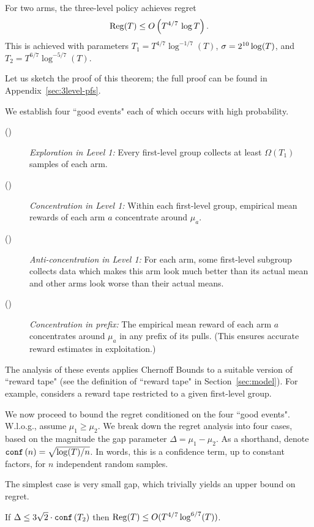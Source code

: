 \begin{theorem}
\label{thm:3level}
For two arms, the three-level policy
achieves regret
\[ \mathrm{Reg}(T) \leq O\left( T^{4/7}\, \log T \right).\]
This is achieved with parameters
    $T_1 = T^{4/7}\log^{-1/7}(T)$,
    $\sigma = 2^{10}\log(T)$, and
    $T_2 = T^{6/7}\log^{-5/7}(T)$.
\end{theorem}

Let us sketch the proof of this theorem; the full proof can be found in Appendix~\ref{sec:3level-pfs}.

We establish four ``good events" each of which occurs with high probability.
\begin{description}
\item[()] \emph{Exploration in Level 1:} Every first-level group collects at least $\Omega(T_1)$ samples of each arm.
\item[()] \emph{Concentration in Level 1:} Within each first-level group, empirical mean rewards of each arm $a$ concentrate around $\mu_a$.
\item[()] \emph{Anti-concentration in Level 1:} For each arm, some first-level subgroup collects data which makes this arm look much better than its actual mean and other arms look worse than their actual means.
\item[()] \emph{Concentration in prefix:}
The empirical mean reward of each arm $a$ concentrates around $\mu_a$ in any prefix of its pulls. (This ensures accurate reward estimates in exploitation.)
\end{description}

The analysis of these events applies Chernoff Bounds to a suitable version of ``reward tape" (see the definition of ``reward tape" in Section~\ref{sec:model}). For example,  considers a reward tape restricted to a given first-level group.

We now proceed to bound the regret conditioned on the four ``good events". W.l.o.g., assume $\mu_1 \geq \mu_2$. We break down the regret analysis into four cases, based on the magnitude the gap parameter $\Delta = \mu_1-\mu_2$. As a shorthand, denote
    $\mathtt{conf}\left(n\right) = \sqrt{\log(T)/n}$.
In words, this is a confidence term, up to constant factors, for $n$ independent random samples.

The simplest case is very small gap, which trivially yields an upper bound on regret.

\begin{claim}
If
    $\Delta \leq 3\sqrt{2}\cdot  \mathtt{conf}\left(T_2\right)$
then
  $\mathrm{Reg}(T)\leq O(T^{4/7} \log^{6/7}(T))$.
\end{claim}

